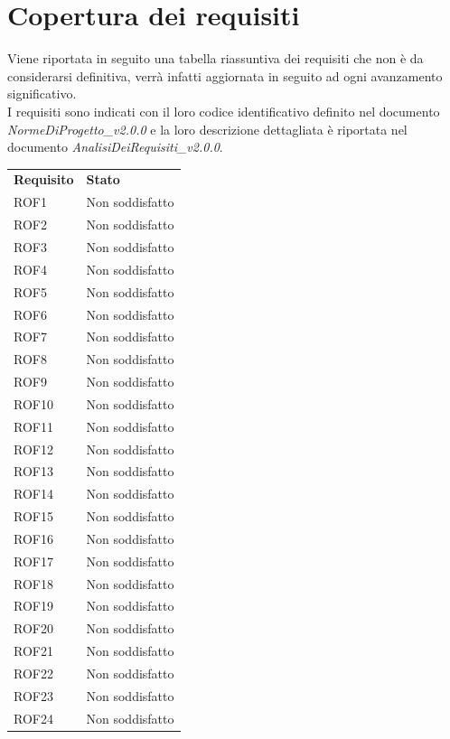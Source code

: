 \section{Copertura dei requisiti}
Viene riportata in seguito una tabella riassuntiva dei requisiti che non è da considerarsi definitiva, verrà infatti aggiornata in seguito ad ogni avanzamento significativo. \\
I requisiti sono indicati con il loro codice identificativo definito nel documento \textit{NormeDiProgetto\_v2.0.0} e la loro descrizione dettagliata è riportata nel documento \textit{AnalisiDeiRequisiti\_v2.0.0}.
\begin{longtable}{| p{2.5cm} | p{3cm} |}
	\rowcolor{LightBlue}
	\color{white}\bfseries Requisito & \color{white}\bfseries Stato \\
	ROF1 & Non soddisfatto \\ \hline
	ROF2 & Non soddisfatto \\ \hline
	ROF3 & Non soddisfatto \\ \hline
	ROF4 & Non soddisfatto \\ \hline
	ROF5 & Non soddisfatto \\ \hline
	ROF6 & Non soddisfatto \\ \hline
	ROF7 & Non soddisfatto \\ \hline
	ROF8 & Non soddisfatto \\ \hline
	ROF9 & Non soddisfatto \\ \hline
	ROF10 & Non soddisfatto \\ \hline
	ROF11 & Non soddisfatto \\ \hline
	ROF12 & Non soddisfatto \\ \hline
	ROF13 & Non soddisfatto \\ \hline
	ROF14 & Non soddisfatto \\ \hline
	ROF15 & Non soddisfatto \\ \hline
	ROF16 & Non soddisfatto \\ \hline
	ROF17 & Non soddisfatto \\ \hline
	ROF18 & Non soddisfatto \\ \hline
	ROF19 & Non soddisfatto \\ \hline
	ROF20 & Non soddisfatto \\ \hline
	ROF21 & Non soddisfatto \\ \hline
	ROF22 & Non soddisfatto \\ \hline
	ROF23 & Non soddisfatto \\ \hline
	ROF24 & Non soddisfatto \\ \hline

\end{longtable}
